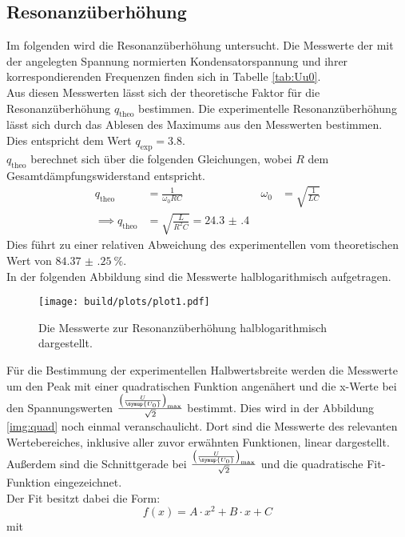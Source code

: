 \subsection{Resonanzüberhöhung}
Im folgenden wird die Resonanzüberhöhung untersucht. 
Die Messwerte der mit der angelegten Spannung normierten Kondensatorspannung und ihrer korrespondierenden Frequenzen finden sich in Tabelle \ref{tab:Uu0}.\\
Aus diesen Messwerten lässt sich der theoretische Faktor für die Resonanzüberhöhung $q_\text{theo}$ bestimmen.
Die experimentelle Resonanzüberhöhung lässt sich durch das Ablesen des Maximums aus den Messwerten bestimmen. \\
Dies entspricht dem Wert $q_\text{exp}=3.8$.\\
$q_\text{theo}$ berechnet sich über die folgenden Gleichungen, wobei $R$ dem Gesamtdämpfungswiderstand entspricht.
\begin{align*}
    q_\text{theo}&= \frac{1}{\omega_0RC}& \omega_0&=\sqrt{\frac{1}{LC}}\\
    \implies q_\text{theo}&=\sqrt{\frac{L}{R^2C}}=\SI{24.3(4)}{}
\end{align*}
Dies führt zu einer relativen Abweichung des experimentellen vom theoretischen Wert von $\SI{84.37(25)}{\percent}$.\\
In der folgenden Abbildung sind die Messwerte halblogarithmisch aufgetragen.
\begin{figure}[H]
    \centering
    \texttt{[image: build/plots/plot1.pdf]}
    \caption{Die Messwerte zur Resonanzüberhöhung halblogarithmisch dargestellt.}
    \label{img:Uu0}
\end{figure}
\noindent
Für die Bestimmung der experimentellen Halbwertsbreite werden die Messwerte um den Peak mit einer quadratischen Funktion angenähert und die x-Werte
bei den Spannungswerten $\frac{{\left(\frac{U}{\symup{U_0}}\right)}_\text{max}}{\sqrt{2}}$ bestimmt. Dies wird in der Abbildung \ref{img:quad} noch einmal veranschaulicht.
Dort sind die Messwerte des relevanten Wertebereiches, inklusive aller zuvor erwähnten Funktionen, linear dargestellt.
Außerdem sind die Schnittgerade bei $\frac{{\left(\frac{U}{\symup{U_0}}\right)}_\text{max}}{\sqrt{2}}$ und die quadratische Fit-Funktion eingezeichnet.\\
Der Fit besitzt dabei die Form:
\begin{equation*}
    f(x)= A\cdot x^2 +B\cdot x+ C
\end{equation*}
mit 

